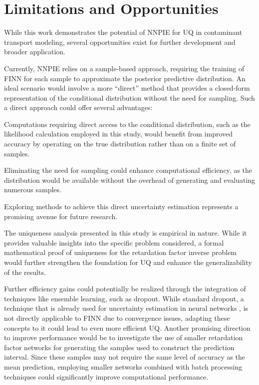 \section{Limitations and Opportunities}
While this work demonstrates the potential of NNPIE for UQ in contaminant transport modeling, several opportunities exist for further development and broader application.

Currently, NNPIE relies on a sample-based approach, requiring the training of FINN for each sample to approximate the posterior predictive distribution. An ideal scenario would involve a more ``direct'' method that provides a closed-form representation of the conditional distribution without the need for sampling. Such a direct approach could offer several advantages:
\begin{enumerate*}
    \item Computations requiring direct access to the conditional distribution, such as the likelihood calculation employed in this study, would benefit from improved accuracy by operating on the true distribution rather than on a finite set of samples.
    \item Eliminating the need for sampling could enhance computational efficiency, as the distribution would be available without the overhead of generating and evaluating numerous samples.
\end{enumerate*}
Exploring methods to achieve this direct uncertainty estimation represents a promising avenue for future research.

The uniqueness analysis presented in this study is empirical in nature. While it provides valuable insights into the specific problem considered, a formal mathematical proof of uniqueness for the retardation factor inverse problem would further strengthen the foundation for UQ and enhance the generalizability of the results.

Further efficiency gains could potentially be realized through the integration of techniques like ensemble learning, such as dropout. While standard dropout, a technique that is already used for uncertainty estimation in neural networks \cite{gal2016dropout}, is not directly applicable to FINN due to convergence issues, adapting these concepts to it could lead to even more efficient UQ.
Another promising direction to improve performance would be to investigate the use of smaller retardation factor networks for generating the samples used to construct the prediction interval. Since these samples may not require the same level of accuracy as the mean prediction, employing smaller networks combined with batch processing techniques could significantly improve computational performance.

